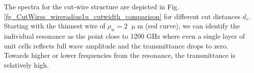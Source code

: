 The spectra for the cut-wire structure are depicted in Fig. \ref{fg_CutWires_wireradius1u_cutwidth_comparison} for different cut distances $d_c$. Starting with the thinnest wire of $\rho_w = 2$ $\upmu$m (red curve), we can identify the individual resonance as the point close to  1200 GHz where even a single layer of unit cells reflects full wave amplitude and the transmittance drops to zero. Towards higher or lower frequencies from the resonance, the transmittance is relatively high.

